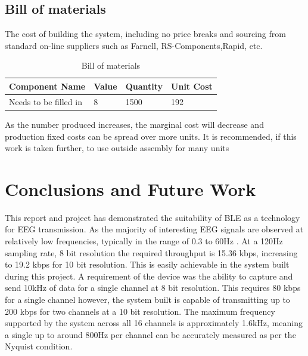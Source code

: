 \documentclass[]{article}
\begin{document}
\subsection{Bill of materials}

The cost of building the system, including no price breaks and sourcing from standard on-line suppliers such as Farnell, RS-Components,Rapid, etc.

\begin{table}[H]
\centering
\caption{Bill of materials}
\label{fig:sensors}
\begin{tabular}{|p{1.1in}|p{1.1in}|p{1.1in}|p{1.1in}|} \hline 
\textbf{Component Name} & \textbf{Value} & \textbf{Quantity} & \textbf{Unit Cost} \\ \hline 
Needs to be filled in & 8 & 1500 & 192 \\ \hline  



\end{tabular}
\end{table}

As the number produced increases, the marginal cost will decrease and production fixed costs can be spread over more units. It is recommended, if this work is taken further, to use outside assembly for many units

\clearpage 
\section{Conclusions and Future Work}

This report and project has demonstrated the suitability of \ac{BLE} as a technology for \ac{EEG} transmission. As the majority of interesting \ac{EEG} signals are observed at relatively low frequencies, typically in the range of 0.3 to 60Hz \cite{eeeman}. At a 120Hz sampling rate, 8 bit resolution the required throughput is 15.36 kbps, increasing to 19.2 kbps for 10 bit resolution. This is easily achievable in the system built during this project. A requirement of the device was the ability to capture and send 10kHz of data for a single channel at 8 bit resolution. This requires 80 kbps for a single channel however, the system built is capable of transmitting up to 200 kbps for two channels at a 10 bit resolution. The maximum frequency supported by the system across all 16 channels is approximately 1.6kHz, meaning a single up to around 800Hz per channel can be accurately measured as per the Nyquist condition. 
\end{document}
